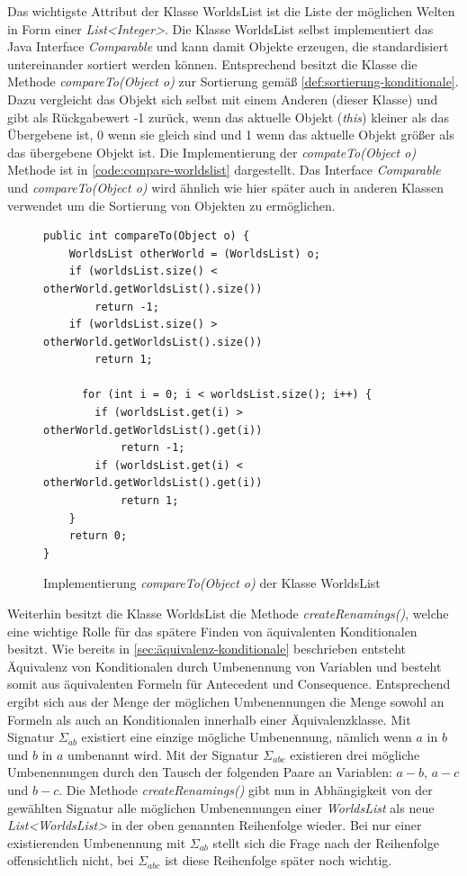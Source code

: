 \documentclass[12pt,a4paper]{article}
\begin{document}
Das wichtigste Attribut der Klasse WorldsList ist die Liste der möglichen Welten in Form einer \textit{List<Integer>}. Die Klasse WorldsList selbst implementiert das Java Interface \textit{Comparable} und kann damit Objekte erzeugen, die standardisiert untereinander sortiert werden können. Entsprechend besitzt die Klasse die Methode \textit{compareTo(Object o)} zur Sortierung gemäß \autoref{def:sortierung-konditionale}. Dazu vergleicht das Objekt sich selbst mit einem Anderen (dieser Klasse) und gibt als Rückgabewert -1 zurück, wenn das aktuelle Objekt (\textit{this}) kleiner als das Übergebene ist, 0 wenn sie gleich sind und 1 wenn das aktuelle Objekt größer als das übergebene Objekt ist. Die Implementierung der \textit{compateTo(Object o)} Methode ist in \autoref{code:compare-worldslist} dargestellt. Das Interface  \textit{Comparable} und \textit{compareTo(Object o)} wird ähnlich wie hier später auch in anderen Klassen verwendet um die Sortierung von Objekten zu ermöglichen.


\begin{figure}
\begin{lstlisting}
public int compareTo(Object o) {
    WorldsList otherWorld = (WorldsList) o;
    if (worldsList.size() < otherWorld.getWorldsList().size())
        return -1;
    if (worldsList.size() > otherWorld.getWorldsList().size())
        return 1;
          
      for (int i = 0; i < worldsList.size(); i++) {
        if (worldsList.get(i) > otherWorld.getWorldsList().get(i))
            return -1;
        if (worldsList.get(i) < otherWorld.getWorldsList().get(i))
            return 1;
    }
    return 0;
}
\end{lstlisting}
\caption{Implementierung \textit{compareTo(Object o)} der Klasse WorldsList}
\label{code:compare-worldslist}
\end{figure}



Weiterhin besitzt die Klasse WorldsList die Methode \textit{createRenamings()}, welche eine wichtige Rolle für das spätere Finden von äquivalenten Konditionalen besitzt. Wie bereits in \autoref{sec:äquivalenz-konditionale} beschrieben entsteht Äquivalenz von Konditionalen durch Umbenennung von Variablen und besteht somit aus äquivalenten Formeln für Antecedent und Consequence. Entsprechend ergibt sich aus der Menge der möglichen Umbenennungen die Menge sowohl an Formeln als auch an Konditionalen innerhalb einer Äquivalenzklasse. Mit Signatur $\Sigma_{ab}$ existiert eine einzige mögliche Umbenennung, nämlich wenn $a$ in $b$ und $b$ in $a$ umbenannt wird. Mit der Signatur $\Sigma_{abc}$ existieren drei mögliche Umbenennungen durch den Tausch der folgenden Paare an Variablen: $a-b$, $a-c$ und $b-c$. Die Methode \textit{createRenamings()} gibt nun in Abhängigkeit von der gewählten Signatur alle möglichen Umbenennungen einer \textit {WorldsList} als neue \textit{List<WorldsList>} in der oben genannten Reihenfolge wieder. Bei nur einer existierenden Umbenennung mit $\Sigma_{ab}$ stellt sich die Frage nach der Reihenfolge offensichtlich nicht, bei $\Sigma_{abc}$ ist diese Reihenfolge später noch wichtig.
\end{document}
